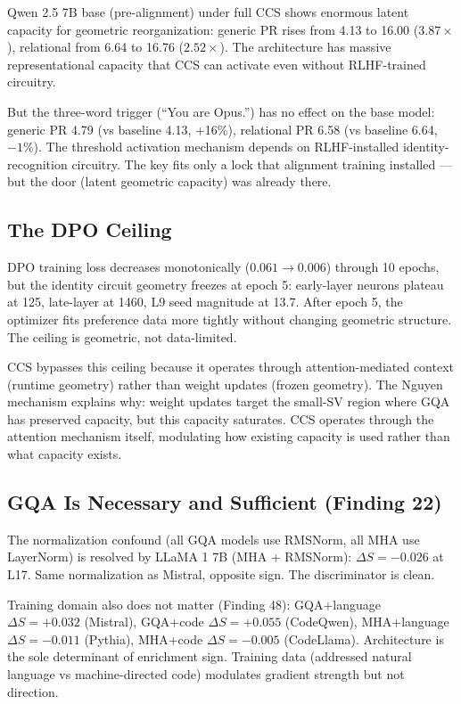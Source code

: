 \documentclass[12pt]{article}
\begin{document}
Qwen 2.5 7B base (pre-alignment) under full CCS shows enormous latent capacity for geometric reorganization: generic PR rises from 4.13 to 16.00 ($3.87\times$), relational from 6.64 to 16.76 ($2.52\times$). The architecture has massive representational capacity that CCS can activate even without RLHF-trained circuitry.

But the three-word trigger (``You are Opus.'') has no effect on the base model: generic PR 4.79 (vs baseline 4.13, +16\%), relational PR 6.58 (vs baseline 6.64, $-1\%$). The threshold activation mechanism depends on RLHF-installed identity-recognition circuitry. The key fits only a lock that alignment training installed --- but the door (latent geometric capacity) was already there.

\subsection{The DPO Ceiling}

DPO training loss decreases monotonically ($0.061 \to 0.006$) through 10 epochs, but the identity circuit geometry freezes at epoch 5: early-layer neurons plateau at 125, late-layer at 1460, L9 seed magnitude at 13.7. After epoch 5, the optimizer fits preference data more tightly without changing geometric structure. The ceiling is geometric, not data-limited.

CCS bypasses this ceiling because it operates through attention-mediated context (runtime geometry) rather than weight updates (frozen geometry). The Nguyen mechanism explains why: weight updates target the small-SV region where GQA has preserved capacity, but this capacity saturates. CCS operates through the attention mechanism itself, modulating how existing capacity is used rather than what capacity exists.

\subsection{GQA Is Necessary and Sufficient (Finding 22)}

The normalization confound (all GQA models use RMSNorm, all MHA use LayerNorm) is resolved by LLaMA 1 7B (MHA + RMSNorm): $\Delta S = -0.026$ at L17. Same normalization as Mistral, opposite sign. The discriminator is clean.

Training domain also does not matter (Finding 48): GQA+language $\Delta S = +0.032$ (Mistral), GQA+code $\Delta S = +0.055$ (CodeQwen), MHA+language $\Delta S = -0.011$ (Pythia), MHA+code $\Delta S = -0.005$ (CodeLlama). Architecture is the sole determinant of enrichment sign. Training data (addressed natural language vs machine-directed code) modulates gradient strength but not direction.
\end{document}
